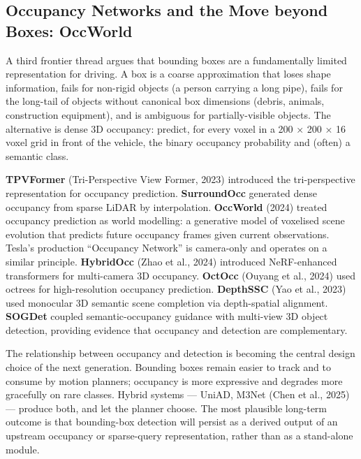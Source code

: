 \documentclass{article}
\begin{document}
\subsection{Occupancy Networks and the Move beyond Boxes: OccWorld}\label{occupancy-networks-and-the-move-beyond-boxes-occworld}

A third frontier thread argues that bounding boxes are a fundamentally limited representation for driving. A box is a coarse approximation that loses shape information, fails for non-rigid objects (a person carrying a long pipe), fails for the long-tail of objects without canonical box dimensions (debris, animals, construction equipment), and is ambiguous for partially-visible objects. The alternative is dense 3D occupancy: predict, for every voxel in a 200 × 200 × 16 voxel grid in front of the vehicle, the binary occupancy probability and (often) a semantic class.

\textbf{TPVFormer} (Tri-Perspective View Former, 2023) introduced the tri-perspective representation for occupancy prediction. \textbf{SurroundOcc} generated dense occupancy from sparse LiDAR by interpolation. \textbf{OccWorld} (2024) treated occupancy prediction as world modelling: a generative model of voxelised scene evolution that predicts future occupancy frames given current observations. Tesla's production ``Occupancy Network'' is camera-only and operates on a similar principle. \textbf{HybridOcc} (Zhao et al., 2024) introduced NeRF-enhanced transformers for multi-camera 3D occupancy. \textbf{OctOcc} (Ouyang et al., 2024) used octrees for high-resolution occupancy prediction. \textbf{DepthSSC} (Yao et al., 2023) used monocular 3D semantic scene completion via depth-spatial alignment. \textbf{SOGDet} \citep{zhou2023unidistillaunivers} coupled semantic-occupancy guidance with multi-view 3D object detection, providing evidence that occupancy and detection are complementary.

The relationship between occupancy and detection is becoming the central design choice of the next generation. Bounding boxes remain easier to track and to consume by motion planners; occupancy is more expressive and degrades more gracefully on rare classes. Hybrid systems --- UniAD, M3Net (Chen et al., 2025) --- produce both, and let the planner choose. The most plausible long-term outcome is that bounding-box detection will persist as a derived output of an upstream occupancy or sparse-query representation, rather than as a stand-alone module.
\end{document}
